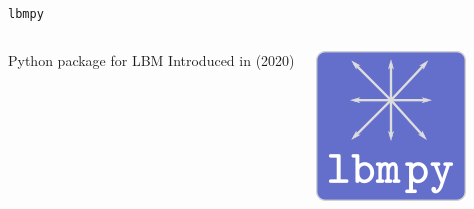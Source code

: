 \begin{frame}{\lstinline{lbmpy}}
  \begin{columns}
  \begin{outline}
  \1 Python package for LBM
  \2 Introduced in \cite{Bauer2021} (2020)
  \end{outline}

  \centering
  \begin{center}
    \includegraphics[width=0.2\linewidth]{lbmpy_logo.png}
  \end{center}
\end{columns}
\end{frame}
